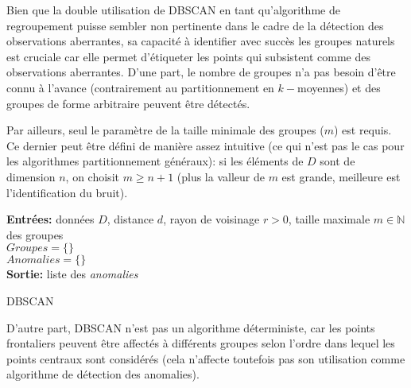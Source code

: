 Bien que la double utilisation de DBSCAN en tant qu'al\-go\-rith\-me de regroupement puisse sembler non pertinente dans le cadre de la détection des observations aberrantes, sa capacité à identifier avec succès les groupes naturels est cruciale car elle permet d'étiqueter les points qui subsistent comme des observations aberrantes.
\newl 
D'une part, le nombre de groupes n'a pas besoin d'être connu à l'avance (contrairement au  partitionnement en $k-$moyennes) et des groupes de forme arbitraire peuvent être détectés. \par Par ailleurs, seul le paramètre de la taille minimale des groupes ($m$) est requis. Ce dernier peut être défini de manière assez intuitive (ce qui n'est pas le cas pour les algorithmes partitionnement généraux): si les éléments de $D$ sont de dimension $n$, on choisit $m\geq n+1$ (plus la valleur de $m$ est grande, meilleure est l'identification du bruit). \begin{algorithm}[t]
\SetAlgoLined
\textbf{Entr\'ees:} donn\'ees $D$,
distance $d$,
rayon de voisinage $r>0$,
taille maximale $m\in\mathbb{N}$ des groupes  
\\$\textit{Groupes} = \{\}$
\\$\textit{Anomalies} = \{\}$
\\
\textbf{Sortie:} liste des  \textit{anomalies}
\caption{DBSCAN}
\label{dbscan}
\end{algorithm}
\newl D'autre part, DBSCAN n'est pas un algorithme déterministe, car les points frontaliers peuvent être affectés à différents groupes selon l'ordre dans lequel les points centraux sont considérés (cela n'affecte toutefois pas son utilisation comme algorithme de détection des anomalies).
